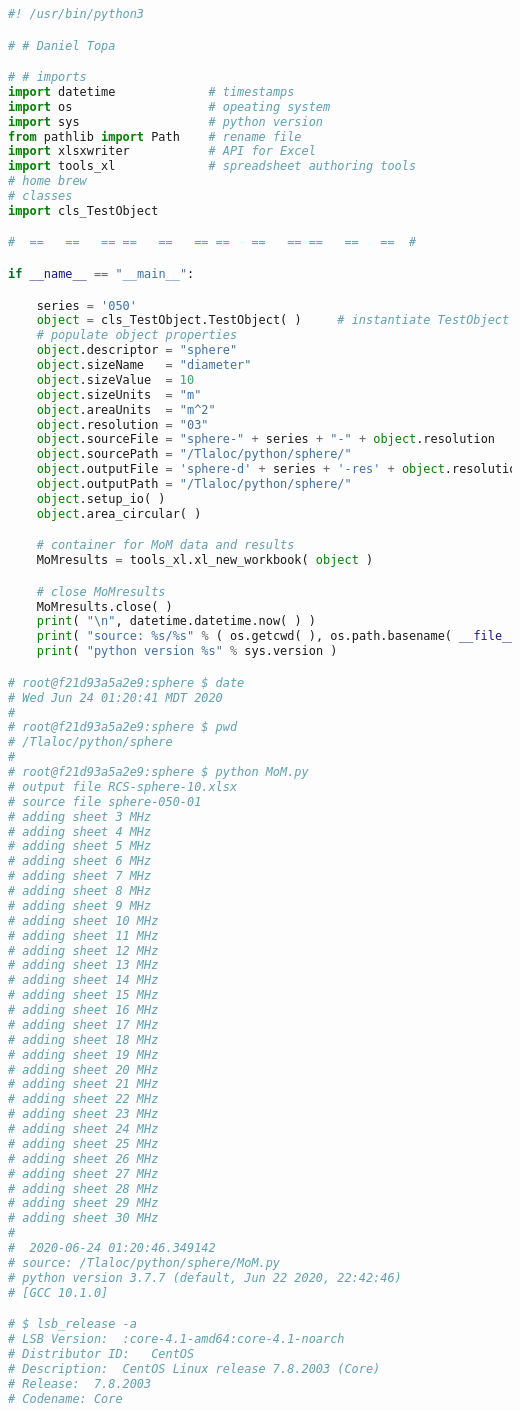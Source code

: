 
{\tiny{
\begin{lstlisting}[language=Python]
#! /usr/bin/python3

# # Daniel Topa

# # imports
import datetime             # timestamps
import os                   # opeating system
import sys                  # python version
from pathlib import Path    # rename file
import xlsxwriter           # API for Excel
import tools_xl             # spreadsheet authoring tools
# home brew
# classes
import cls_TestObject

#  ==   ==   == ==   ==   == ==   ==   == ==   ==   ==  #

if __name__ == "__main__":

    series = '050'
    object = cls_TestObject.TestObject( )     # instantiate TestObject
    # populate object properties
    object.descriptor = "sphere"
    object.sizeName   = "diameter"
    object.sizeValue  = 10
    object.sizeUnits  = "m"
    object.areaUnits  = "m^2"
    object.resolution = "03"
    object.sourceFile = "sphere-" + series + "-" + object.resolution
    object.sourcePath = "/Tlaloc/python/sphere/"
    object.outputFile = 'sphere-d' + series + '-res' + object.resolution + '.xlsx'
    object.outputPath = "/Tlaloc/python/sphere/"
    object.setup_io( )
    object.area_circular( )

    # container for MoM data and results
    MoMresults = tools_xl.xl_new_workbook( object )

    # close MoMresults
    MoMresults.close( )
    print( "\n", datetime.datetime.now( ) )
    print( "source: %s/%s" % ( os.getcwd( ), os.path.basename( __file__ ) ) )
    print( "python version %s" % sys.version )

# root@f21d93a5a2e9:sphere $ date
# Wed Jun 24 01:20:41 MDT 2020
#
# root@f21d93a5a2e9:sphere $ pwd
# /Tlaloc/python/sphere
#
# root@f21d93a5a2e9:sphere $ python MoM.py
# output file RCS-sphere-10.xlsx
# source file sphere-050-01
# adding sheet 3 MHz
# adding sheet 4 MHz
# adding sheet 5 MHz
# adding sheet 6 MHz
# adding sheet 7 MHz
# adding sheet 8 MHz
# adding sheet 9 MHz
# adding sheet 10 MHz
# adding sheet 11 MHz
# adding sheet 12 MHz
# adding sheet 13 MHz
# adding sheet 14 MHz
# adding sheet 15 MHz
# adding sheet 16 MHz
# adding sheet 17 MHz
# adding sheet 18 MHz
# adding sheet 19 MHz
# adding sheet 20 MHz
# adding sheet 21 MHz
# adding sheet 22 MHz
# adding sheet 23 MHz
# adding sheet 24 MHz
# adding sheet 25 MHz
# adding sheet 26 MHz
# adding sheet 27 MHz
# adding sheet 28 MHz
# adding sheet 29 MHz
# adding sheet 30 MHz
#
#  2020-06-24 01:20:46.349142
# source: /Tlaloc/python/sphere/MoM.py
# python version 3.7.7 (default, Jun 22 2020, 22:42:46)
# [GCC 10.1.0]

# $ lsb_release -a
# LSB Version:	:core-4.1-amd64:core-4.1-noarch
# Distributor ID:	CentOS
# Description:	CentOS Linux release 7.8.2003 (Core)
# Release:	7.8.2003
# Codename:	Core
\end{lstlisting}
}}

\endinput  %
